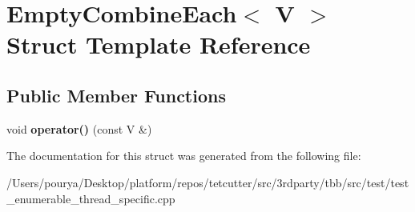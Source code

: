 \hypertarget{structEmptyCombineEach}{}\section{Empty\+Combine\+Each$<$ V $>$ Struct Template Reference}
\label{structEmptyCombineEach}
\subsection*{Public Member Functions}
\begin{DoxyCompactItemize}
\item 
\hypertarget{structEmptyCombineEach_abc59c0d5744045ea957f5c2c1f6601ee}{}void {\bfseries operator()} (const V \&)\label{structEmptyCombineEach_abc59c0d5744045ea957f5c2c1f6601ee}

\end{DoxyCompactItemize}


The documentation for this struct was generated from the following file\+:\begin{DoxyCompactItemize}
\item 
/\+Users/pourya/\+Desktop/platform/repos/tetcutter/src/3rdparty/tbb/src/test/test\+\_\+enumerable\+\_\+thread\+\_\+specific.\+cpp\end{DoxyCompactItemize}
